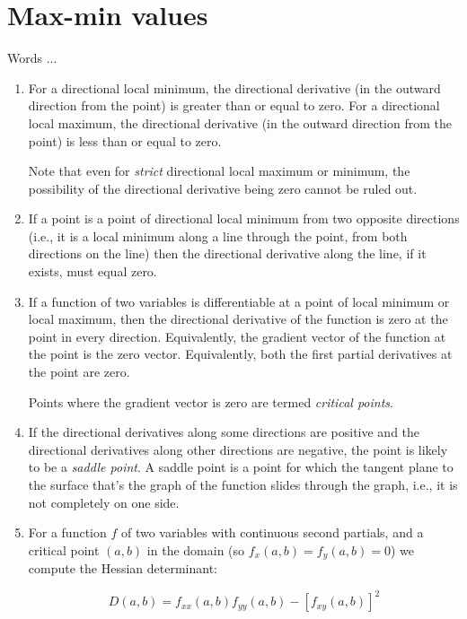 \documentclass[10pt]{amsart}
\begin{document}
\section{Max-min values}

Words ...

\begin{enumerate}
\item For a directional local minimum, the directional derivative (in
  the outward direction from the point) is greater than or equal to
  zero. For a directional local maximum, the directional derivative
  (in the outward direction from the point) is less than or equal to
  zero.

  Note that even for {\em strict} directional local maximum or
  minimum, the possibility of the directional derivative being zero
  cannot be ruled out.
\item If a point is a point of directional local minimum from two
  opposite directions (i.e., it is a local minimum along a line
  through the point, from both directions on the line) then the
  directional derivative along the line, if it exists, must equal
  zero.
\item If a function of two variables is differentiable at a point of
  local minimum or local maximum, then the directional derivative of
  the function is zero at the point in every direction. Equivalently,
  the gradient vector of the function at the point is the zero
  vector. Equivalently, both the first partial derivatives at the
  point are zero.
  
  Points where the gradient vector is zero are termed {\em critical
  points}. 
\item If the directional derivatives along some directions are
  positive and the directional derivatives along other directions are
  negative, the point is likely to be a {\em saddle point}. A saddle
  point is a point for which the tangent plane to the surface that's
  the graph of the function slides through the graph, i.e., it is not
  completely on one side.
\item For a function $f$ of two variables with continuous second
  partials, and a critical point $(a,b)$ in the domain (so $f_x(a,b) =
  f_y(a,b) = 0$) we compute the Hessian determinant:

  $$D(a,b) = f_{xx}(a,b)f_{yy}(a,b) - [f_{xy}(a,b)]^2$$


\end{enumerate}
\end{document}
